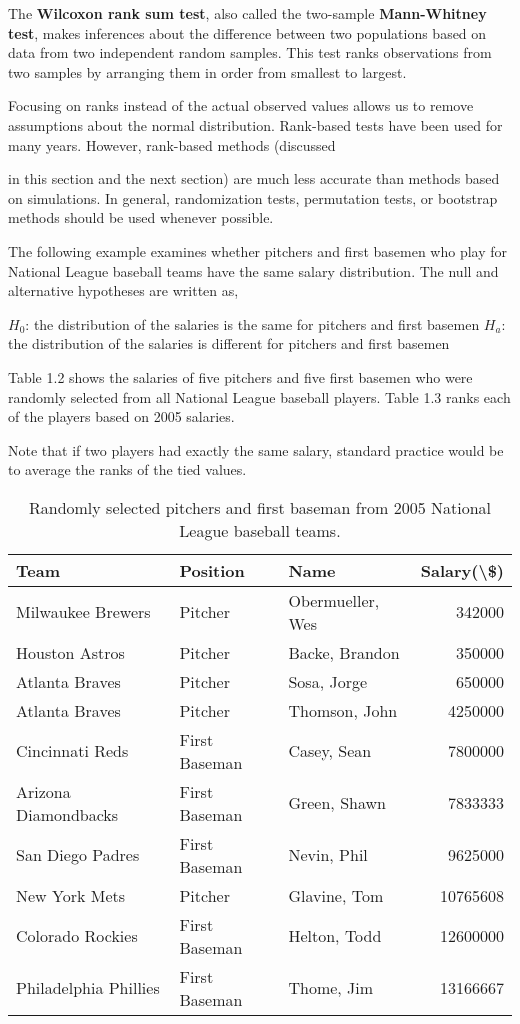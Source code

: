\documentclass[
]{report}
\theoremstyle{definition}
\theoremstyle{definition}
\theoremstyle{definition}
\theoremstyle{definition}
\theoremstyle{remark}
\begin{document}
The \textbf{Wilcoxon rank sum test}, also called the two-sample \textbf{Mann-Whitney test}, makes inferences about the difference between two populations based on data from two independent random samples. This test ranks observations from two samples by arranging them in order from smallest to largest.

Focusing on ranks instead of the actual observed values allows us to remove assumptions about the normal distribution. Rank-based tests have been used for many years. However, rank-based methods (discussed

in this section and the next section) are much less accurate than methods based on simulations. In general, randomization tests, permutation tests, or bootstrap methods should be used whenever possible.

The following example examines whether pitchers and first basemen who play for National League baseball teams have the same salary distribution. The null and alternative hypotheses are written as,

\(H_0\): the distribution of the salaries is the same for pitchers and first basemen
\(H_a\): the distribution of the salaries is different for pitchers and first basemen

Table 1.2 shows the salaries of five pitchers and five first basemen who were randomly selected from all National League baseball players. Table 1.3 ranks each of the players based on 2005 salaries.

Note that if two players had exactly the same salary, standard practice would be to average the ranks of the tied values.

\begin{table}

\caption{\label{tab:table2}Randomly selected pitchers and first baseman from 2005 National League baseball teams.}
\centering
\begin{tabular}[t]{lllr}
\toprule
Team & Position & Name & Salary(\textbackslash{}\$)\\
\midrule
Milwaukee Brewers & Pitcher & Obermueller, Wes & 342000\\
Houston Astros & Pitcher & Backe, Brandon & 350000\\
Atlanta Braves & Pitcher & Sosa, Jorge & 650000\\
Atlanta Braves & Pitcher & Thomson, John & 4250000\\
Cincinnati Reds & First Baseman & Casey, Sean & 7800000\\
\addlinespace
Arizona Diamondbacks & First Baseman & Green, Shawn & 7833333\\
San Diego Padres & First Baseman & Nevin, Phil & 9625000\\
New York Mets & Pitcher & Glavine, Tom & 10765608\\
Colorado Rockies & First Baseman & Helton, Todd & 12600000\\
Philadelphia Phillies & First Baseman & Thome, Jim & 13166667\\
\bottomrule
\end{tabular}
\end{table}
\end{document}
